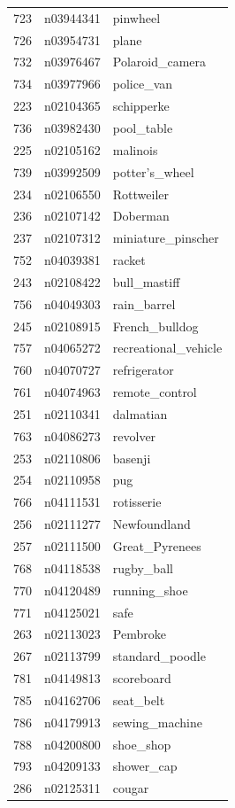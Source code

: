 \begin{table}
\begin{tabular}{cll}
723 & n03944341 & pinwheel \\
726 & n03954731 & plane \\
732 & n03976467 & Polaroid_camera \\
734 & n03977966 & police_van \\
223 & n02104365 & schipperke \\
736 & n03982430 & pool_table \\
225 & n02105162 & malinois \\
739 & n03992509 & potter's_wheel \\
234 & n02106550 & Rottweiler \\
236 & n02107142 & Doberman \\
237 & n02107312 & miniature_pinscher \\
752 & n04039381 & racket \\
243 & n02108422 & bull_mastiff \\
756 & n04049303 & rain_barrel \\
245 & n02108915 & French_bulldog \\
757 & n04065272 & recreational_vehicle \\
760 & n04070727 & refrigerator \\
761 & n04074963 & remote_control \\
251 & n02110341 & dalmatian \\
763 & n04086273 & revolver \\
253 & n02110806 & basenji \\
254 & n02110958 & pug \\
766 & n04111531 & rotisserie \\
256 & n02111277 & Newfoundland \\
257 & n02111500 & Great_Pyrenees \\
768 & n04118538 & rugby_ball \\
770 & n04120489 & running_shoe \\
771 & n04125021 & safe \\
263 & n02113023 & Pembroke \\
267 & n02113799 & standard_poodle \\
781 & n04149813 & scoreboard \\
785 & n04162706 & seat_belt \\
786 & n04179913 & sewing_machine \\
788 & n04200800 & shoe_shop \\
793 & n04209133 & shower_cap \\
286 & n02125311 & cougar \\

\end{tabular}
\end{table}
